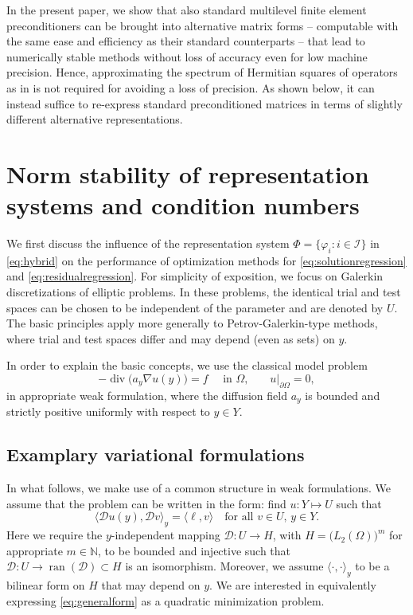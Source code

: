 \documentclass[a4paper,11pt]{amsart}
\DeclareMathOperator{\ran}{ran}
\DeclareMathOperator*{\Div}{div}
\numberwithin{equation}{section}
\theoremstyle{definition}
\theoremstyle{remark}
\theoremstyle{plain}
\newcommand{\N}{\mathbb{N}}
\begin{document}
%
%
%
%
%
%
%
%
%
%
%
%
 
%
   
   In the present paper, we show   that also standard multilevel finite element preconditioners can be brought into alternative matrix forms -- computable with the same ease and efficiency as their standard counterparts -- that lead to numerically stable methods without loss of accuracy even  for low machine precision. 
   Hence, approximating the spectrum of Hermitian squares of operators as in 
    \cite{MR4839137} %
    is  not required for avoiding a loss of precision. As shown below, it can instead suffice to re-express standard preconditioned matrices in terms of slightly different alternative representations.



\section{Norm stability of representation systems and condition numbers}

We first discuss the influence of the representation system $\Phi = \{ \varphi_i \colon i  \in \mathcal I\}$ in
\eqref{eq:hybrid} on the performance of optimization methods for \eqref{eq:solutionregression} and \eqref{eq:residualregression}.
For simplicity of exposition,   we focus on Galerkin discretizations of elliptic problems. 
In these problems, the identical trial and test spaces can be chosen to be independent of the parameter and are denoted by $U$.
The basic principles apply more generally to Petrov-Galerkin-type methods, where trial and test spaces differ and may depend (even as sets) on $y$.

In order to explain  the basic concepts, we use the classical model problem
\begin{equation}
  - \Div \bigl(a_y \nabla u(y) \bigr) = f\quad \text{ in $\Omega$,} \qquad u|_{\partial\Omega} = 0,
\end{equation}
in appropriate weak formulation, where the diffusion field $a_y$ is bounded and strictly positive uniformly with respect to $y \in Y$.

\subsection{Examplary variational formulations}

In what follows, we make use of a common structure in weak formulations. We assume that the problem can be written in the form: find $u \colon Y \mapsto U$ such that
\begin{equation}\label{eq:generalform}
    \langle \mathcal D u(y), \mathcal D v \rangle_y = \langle \ell, v \rangle \quad \text{for all $v \in U$, $y \in Y$.} 
\end{equation}
Here we require the $y$-independent mapping $\mathcal D \colon U \to H$, with $H = \bigl(L_2(\Omega)\bigr)^m$ for appropriate $m \in \N$,  to be bounded and injective such that $\mathcal D \colon U \to \ran(\mathcal D) \subset H$ is an isomorphism. Moreover,  we assume $\langle \cdot, \cdot \rangle_y$ to be a bilinear form on $H$ that may depend on $y$. We are interested
in equivalently expressing \eqref{eq:generalform} as a quadratic minimization problem.
\end{document}
